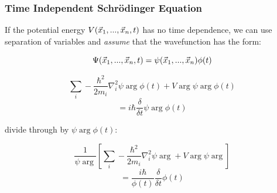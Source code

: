 \documentclass{beamer}
\begin{document}

\begin{frame}
\frametitle{Time Independent Schr\"odinger Equation}
If the potential energy $V(\vec{x}_1,...,\vec{x}_n,t)$ has no time dependence, we can 
use separation of variables and {\it assume} that the wavefunction has the form:

\[ \Psi(\vec{x}_1,...,\vec{x}_n,t) = \psi(\vec{x}_1,...,\vec{x}_n)\phi(t) \]

\[\sum_i - \frac{\hbar^2}{2m_i}\nabla_i^2 \psi\arg\phi(t) + V\arg\psi\arg\phi(t) \]
\[ = i \hbar\frac{\delta}{\delta t} \psi\arg\phi(t) \]

divide through by $\psi\arg\phi(t)$:

\[ \frac{1}{\psi\arg} \left[ \sum_i - \frac{\hbar^2}{2m_i}\nabla_i^2 \psi\arg + V\arg\psi\arg \right] \]
\[ = \frac{i\hbar}{\phi(t)} \frac{\delta}{\delta t} \phi(t) \]

\end{frame}
\end{document}
